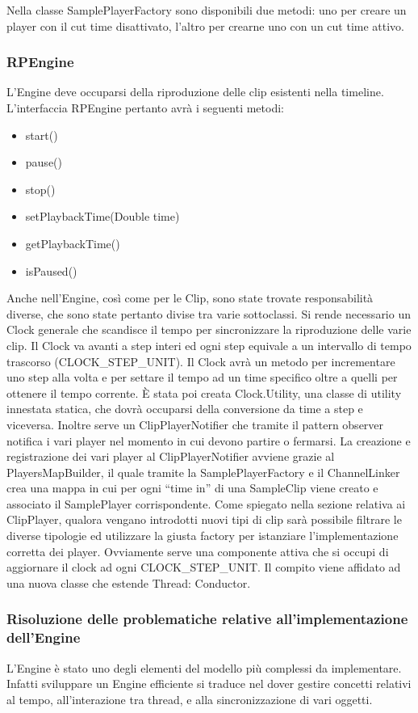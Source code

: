 \documentclass[a4paper,12pt]{report}
\begin{document}
Nella classe SamplePlayerFactory sono disponibili due metodi: uno per creare un player con il cut time disattivato, l’altro per crearne uno con un cut time attivo.
\endsubsubsection
\subsubsection{RPEngine}
L’Engine deve occuparsi della riproduzione delle clip esistenti nella timeline.
L’interfaccia RPEngine pertanto avrà i seguenti metodi:
\begin{itemize}
    \item start()
    \item pause()
    \item stop()
    \item setPlaybackTime(Double time)
    \item getPlaybackTime()
    \item isPaused()
\end{itemize}
Anche nell’Engine, così come per le Clip, sono state trovate responsabilità diverse, che sono state pertanto divise tra varie sottoclassi.
Si rende necessario un Clock generale che scandisce il tempo per sincronizzare la riproduzione delle varie clip.
Il Clock va avanti a step interi ed ogni step equivale a un intervallo di tempo trascorso (CLOCK\_STEP\_UNIT).
Il Clock avrà un metodo per incrementare uno step alla volta e per settare il tempo ad un time specifico oltre a quelli per ottenere il tempo corrente.
È stata poi creata Clock.Utility, una classe di utility innestata statica, che dovrà occuparsi della conversione da time a step e viceversa.
Inoltre serve un ClipPlayerNotifier che tramite il pattern observer notifica i vari player nel momento in cui devono partire o fermarsi.
La creazione e registrazione dei vari player al ClipPlayerNotifier avviene grazie al PlayersMapBuilder, il quale tramite la SamplePlayerFactory e il ChannelLinker crea una mappa in cui per ogni “time in” di una SampleClip viene creato e associato il SamplePlayer corrispondente.
Come spiegato nella sezione relativa ai ClipPlayer, qualora vengano introdotti nuovi tipi di clip sarà possibile filtrare le diverse tipologie ed utilizzare la giusta factory per istanziare l’implementazione corretta dei player.
Ovviamente serve una componente attiva che si occupi di aggiornare il clock ad ogni CLOCK\_STEP\_UNIT. Il compito viene affidato ad una nuova classe che estende Thread: Conductor.
\subsubsection{Risoluzione delle problematiche relative all’implementazione dell’Engine}
L’Engine è stato uno degli elementi del modello più complessi da implementare. Infatti sviluppare un Engine efficiente si traduce nel dover gestire concetti relativi al tempo, all’interazione tra thread, e alla sincronizzazione di vari oggetti.
\end{document}
